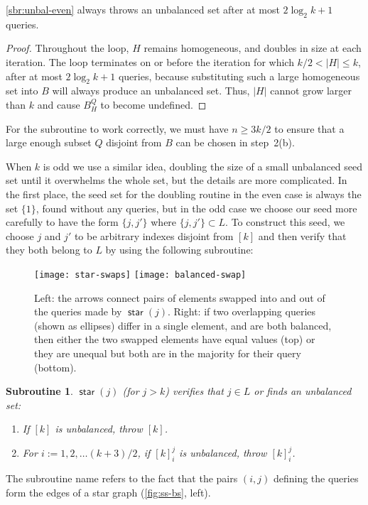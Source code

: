 \documentclass[11pt]{llncs}
\newcommand{\figurescale}{0.5}
\newcommand{\figurescale}{0.45}
\newcommand{\starsub}{\operatorname{\mathsf{star}}}
\newcommand{\assign}{:=}
\newtheorem{subroutine}{Subroutine}
\begin{document}
\ifFull
\begin{lemma}
\autoref{sbr:unbal-even} always throws an unbalanced set after at most $2\log_2 k + 1$ queries.
\end{lemma}

\begin{proof}
\fi
Throughout the loop, $H$ remains homogeneous, and doubles in size at each iteration. The loop terminates on or before the iteration for which $k/2<|H|\le k$,  after at most $2\log_2 k+1$ queries,
because substituting such a large homogeneous set into $B$ will always produce an unbalanced set. Thus, $|H|$ cannot grow larger than $k$ and cause $B_H^Q$ to become undefined.
\ifFull
\end{proof}
\fi
For the subroutine to work correctly, we must have $n\ge 3k/2$ to ensure that  a large enough subset $Q$ disjoint from $B$ can be chosen in step~2(b).

When $k$ is odd we use a similar idea, doubling the size of a small unbalanced seed set until it overwhelms the whole set, but the details are more complicated. In the first place, the seed set for the doubling routine in the even case is always the set $\{1\}$, found without any queries, but in the odd case we choose our seed more carefully to have the form $\{j,j'\}$ where $\{j,j'\}\subset L$.
To construct this seed, we choose $j$ and $j'$ to be arbitrary indexes disjoint from $[k]$ and then verify that they both belong to $L$ by using the following subroutine:

\begin{figure}[t]
\centering
\texttt{[image: star-swaps]}\quad
\texttt{[image: balanced-swap]}
\caption{Left: the arrows connect pairs of elements swapped into and out of the queries made by $\starsub(j)$. Right: if two overlapping queries (shown as ellipses) differ in a single element, and are both balanced, then either the two swapped elements have equal values (top) or they are unequal but both are in the majority for their query (bottom).}
\label{fig:ss-bs}
\end{figure}

\begin{subroutine} $\starsub(j)$ (for $j>k$) verifies that $j\in L$ or finds an unbalanced set:
\begin{enumerate}
\item If $[k]$ is unbalanced, throw $[k]$.
\item For $i\assign 1,2,\dots (k+3)/2$, if $[k]_i^j$ is unbalanced, throw $[k]_i^j$.
\end{enumerate}
\end{subroutine}
The subroutine name refers to the fact that the pairs $(i,j)$ defining the queries form the edges of a star graph (\autoref{fig:ss-bs}, left).
\end{document}
